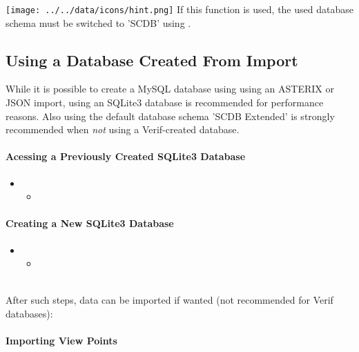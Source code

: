 \texttt{[image: ../../data/icons/hint.png]} If this function is used, the used database schema must be switched to 'SCDB' using . \\

\subsection{Using a Database Created From Import}

While it is possible to create a MySQL database using using an ASTERIX or JSON import, using an SQLite3 database is recommended for performance reasons. Also using the default database schema 'SCDB Extended' is strongly recommended when \textit{not} using a Verif-created database.

\paragraph{Acessing a Previously Created SQLite3 Database} 

\begin{itemize}
\item {}
\begin{itemize}
 \item {}
 \end{itemize}
 \end{itemize}

\paragraph{Creating a New SQLite3 Database}

\begin{itemize}
\item {}
\begin{itemize}
 \item {}
\end{itemize}
\end{itemize}
\ \\

After such steps, data can be imported if wanted (not recommended for Verif databases):

\paragraph{Importing View Points} 

